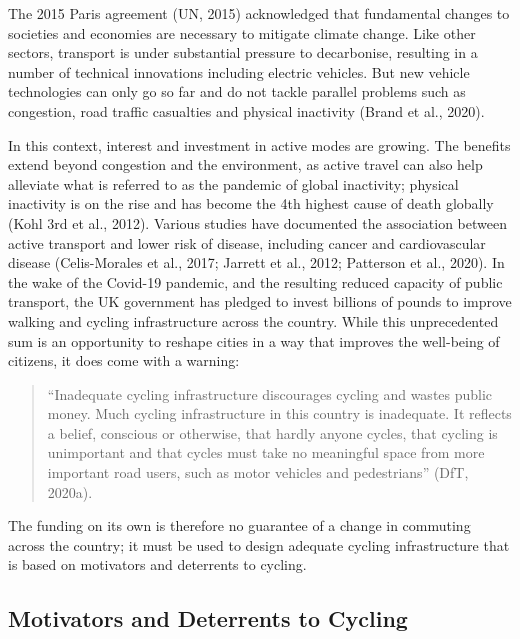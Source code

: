 \documentclass[
]{article}
\begin{document}
The 2015 Paris agreement (UN, 2015) acknowledged that
fundamental changes to societies and economies are necessary to mitigate
climate change. Like other sectors, transport is under substantial
pressure to decarbonise, resulting in a number of technical innovations
including electric vehicles. But new vehicle technologies can only go so
far and do not tackle parallel problems such as congestion, road traffic
casualties and physical inactivity (Brand et al., 2020).

In this context, interest and investment in active modes are growing.
The benefits extend beyond congestion and the environment, as active
travel can also help alleviate what is referred to as the pandemic of
global inactivity; physical inactivity is on the rise and has become the
4th highest cause of death globally (Kohl 3rd et al., 2012). Various
studies have documented the association between active transport and
lower risk of disease, including cancer and cardiovascular disease
(Celis-Morales et al., 2017; Jarrett et al., 2012; Patterson et al., 2020). In the wake of the Covid-19 pandemic, and
the resulting reduced capacity of public transport, the UK government
has pledged to invest billions of pounds to improve walking and cycling
infrastructure across the country. While this unprecedented sum is an
opportunity to reshape cities in a way that improves the well-being of
citizens, it does come with a warning:

\begin{quote}
``Inadequate cycling infrastructure discourages cycling and wastes
public money. Much cycling infrastructure in this country is
inadequate. It reflects a belief, conscious or otherwise, that hardly
anyone cycles, that cycling is unimportant and that cycles must take
no meaningful space from more important road users, such as motor
vehicles and pedestrians'' (DfT, 2020a).
\end{quote}

The funding on its own is therefore no guarantee of a change in
commuting across the country; it must be used to design adequate cycling
infrastructure that is based on motivators and deterrents to cycling.

\hypertarget{motivators-and-deterrents-to-cycling}{%
\subsection{Motivators and Deterrents to Cycling}\label{motivators-and-deterrents-to-cycling}}
\end{document}

